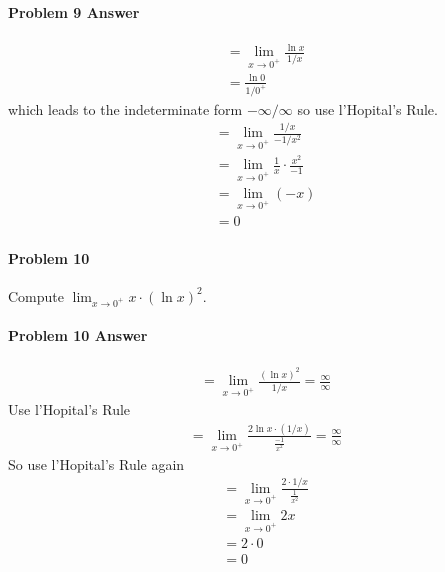 \documentclass[a4paper, 11pt]{article}
\begin{document}
\paragraph{Problem 9 Answer}
\begin{align}
    &= \lim_{x\rightarrow 0^+} \frac{\ln x}{1/x} \nonumber \\
    &= \frac{\ln 0}{1/0^+} \nonumber
\end{align}
which leads to the indeterminate form $-\infty / \infty$ so use l'Hopital's Rule.
\begin{align}
    &= \lim_{x\rightarrow 0^+} \frac{1/x}{-1/x^2}  \nonumber \\
    &= \lim_{x\rightarrow 0^+} \frac{1}{x} \cdot \frac{x^2}{-1} \nonumber \\
    &= \lim_{x\rightarrow 0^+} (-x) \nonumber \\
    &= 0 \nonumber 
\end{align}

\paragraph{Problem 10}
Compute $\lim_{x \rightarrow 0^+} x \cdot \left( \ln x \right)^2$.


\paragraph{Problem 10 Answer}
\begin{align}
    &= \lim_{x\rightarrow 0^+} \frac{\left(\ln x\right)^2}{1/x} = \frac{\infty}{\infty}  \nonumber
\end{align}
Use l'Hopital's Rule
\begin{align}
    &= \lim_{x\rightarrow 0^+} \frac{2\ln x \cdot (1/x)}{\frac{-1}{x^2}} = \frac{\infty}{\infty}  \nonumber
\end{align}
So use l'Hopital's Rule again
\begin{align}
    &= \lim_{x\rightarrow 0^+} \frac{2 \cdot 1/x}{\frac{1}{x^2}}  \nonumber \\
    &= \lim_{x\rightarrow 0^+} 2x \nonumber \\
    &= 2 \cdot 0 \nonumber \\
    &= 0 \nonumber 
\end{align}
\end{document}
